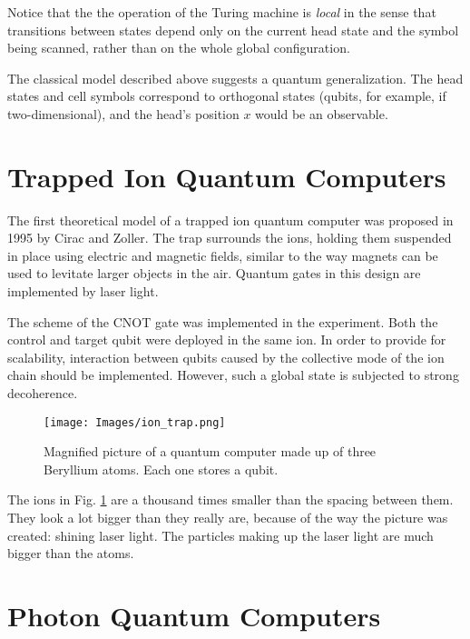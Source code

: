 \documentclass[11pt]{article}
\numberwithin{equation}{section} %
\numberwithin{figure}{section} %
\begin{document}
\begin{appendices}
Notice that the the operation of the Turing machine is \emph{local} in the sense that transitions between states depend only on the current head state and the symbol being scanned, rather than on the whole global configuration.

The classical model described above suggests a quantum generalization. The head states and cell symbols correspond to orthogonal states (qubits, for example, if two-dimensional), and the head's position $x$ would be an observable.


\vspace{1cm}
\section{Trapped Ion Quantum Computers} \label{trapped_ion}
The first theoretical model of a trapped ion quantum computer was proposed in 1995 by Cirac and Zoller. The trap surrounds the ions, holding them suspended in place using electric and magnetic fields, similar to the way magnets can be used to levitate larger objects in the air. Quantum gates in this design are implemented by laser light.





The scheme of the CNOT gate was implemented in the experiment. Both  the control and target qubit were deployed in the same ion. In order to provide for scalability, interaction between qubits caused by the collective mode of the ion chain should be implemented. However, such a global state is subjected to strong decoherence.

\begin{figure}[H] 
	\centering
	\texttt{[image: Images/ion\_trap.png]}
	\caption{Magnified picture of a quantum computer made up of three Beryllium atoms. Each one stores a qubit.}
	  \label{fig:ion_trap}
\end{figure}

The ions in Fig. \ref{fig:ion_trap} are a thousand times smaller than the spacing between them. They look a lot bigger than they really are, because of the way the picture was created:  shining laser light. The particles making up the laser light are much bigger than the atoms.





\vspace{1cm}
\section{Photon Quantum Computers} \label{photon_quantum_computers}


\end{appendices}
\end{document}
